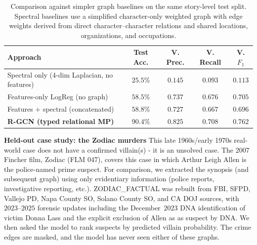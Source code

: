 \documentclass[11pt]{article}
\theoremstyle{definition}
\begin{document}
\begin{table}[h]
\centering
\small
\caption{Comparison against simpler graph baselines on the same story-level test split. Spectral baselines use a simplified character-only weighted graph with edge weights derived from direct character--character relations and shared locations, organizations, and occupations.}
\label{tab:ablation}
\begin{tabular}{lcccc}
\toprule
\textbf{Approach} & \textbf{Test Acc.} & \textbf{V. Prec.} & \textbf{V. Recall} & \textbf{V. $F_1$} \\
\midrule
Spectral only (4-dim Laplacian, no features) & $25.5\%$ & $0.145$ & $0.093$ & $0.113$ \\
Features-only LogReg (no graph) & $58.5\%$ & $0.737$ & $0.676$ & $0.705$ \\
Features $+$ spectral (concatenated) & $58.8\%$ & $0.727$ & $0.667$ & $0.696$ \\
\textbf{R-GCN (typed relational MP)} & $\mathbf{90.4\%}$ & $\mathbf{0.825}$ & $\mathbf{0.708}$ & $\mathbf{0.762}$ \\
\bottomrule
\end{tabular}
\end{table}

\textbf{Held-out case study: the Zodiac murders} This late 1960s/early 1970s real-world case does not have a confirmed villain(s) - it is an unsolved case. The 2007 Fincher film, Zodiac (FLM 047), covers this case in which Arthur Leigh Allen is the police-named prime suspect. For comparison, we extracted the synopsis (and subsequent graph) using only evidentiary information (police reports, investigative reporting, etc.). ZODIAC\_FACTUAL was rebuilt from FBI, SFPD, Vallejo PD, Napa County SO, Solano County SO, and CA DOJ sources, with $2023$--$2025$ forensic updates including the December~$2023$ DNA identification of victim Donna Lass and the explicit exclusion of Allen as as suspect by DNA. We then asked the model to rank suspects by predicted villain probability.  The crime edges are masked, and the model has never seen either of these graphs.  
\end{document}
